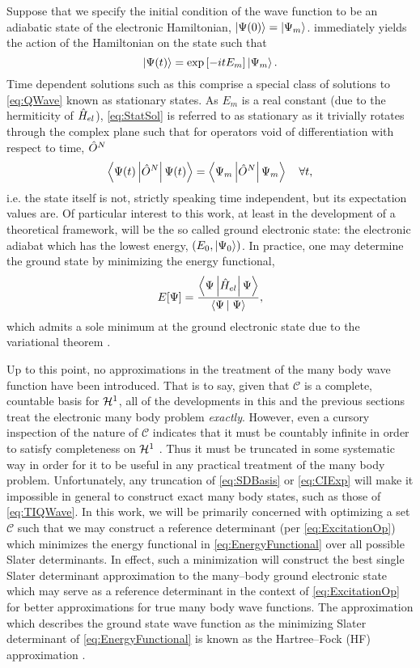 Suppose that we specify the initial condition of the wave function to be an adiabatic state
of the electronic Hamiltonian, $\left\vert \Psi(0) \right\rangle = \left\vert \Psi_m \right\rangle$.  immediately 
yields the action of the Hamiltonian on the state such that
\begin{equation}
\label{eq:StatSol}
\left\vert \Psi(t) \right\rangle = \exp \left[ -it E_m \right] \left\vert \Psi_m \right\rangle. 
\end{equation}
Time dependent solutions such as this comprise a special class of solutions to \cref{eq:QWave} 
known as stationary states. As $E_m$ is a real constant (due to the hermiticity of $\hat{H}_{el}$),
\cref{eq:StatSol} is referred to as stationary as it trivially rotates through the complex plane
such that for operators void of differentiation with respect to time, $\hat{O}^N$
\begin{equation}
\left\langle \Psi(t) \left\vert \hat{O}^N \right\vert \Psi(t) \right\rangle = \left\langle \Psi_m \left\vert \hat{O}^N \right\vert \Psi_m \right\rangle \quad \forall t,
\end{equation}
i.e. the state itself is not, strictly speaking time independent, but its expectation values are.
Of particular interest to this work, at least in the development of a theoretical framework, will be 
the so called ground electronic state: the electronic adiabat which has the lowest energy, $(E_0,\left\vert \Psi_0 \right\rangle)$.
In practice, one may determine the ground state by minimizing the energy functional,
\begin{equation}
\label{eq:EnergyFunctional}
E[\Psi] = \frac{\left\langle \Psi \left\vert \hat{H}_{el} \right\vert \Psi \right\rangle}{\left\langle \Psi \left\vert\right. \Psi \right\rangle},
\end{equation}
which admits a sole minimum at the ground electronic state due to the variational theorem .


Up to this point, no approximations in the treatment of the many body wave function have been introduced. That is
to say, given that $\mathcal{C}$ is a complete, countable basis for $\mathcal{H}^1$, all of the developments
in this and the previous sections treat the electronic many body problem \emph{exactly}. However, even a cursory
inspection of the nature of $\mathcal{C}$ indicates that it must be countably infinite in order to 
satisfy completeness on $\mathcal{H}^1$ . Thus it must be truncated in some systematic
way in order for it to be useful in any practical treatment of the many body problem.
Unfortunately, any truncation of \cref{eq:SDBasis} or \cref{eq:CIExp} will make it impossible in general to
construct exact many body states, such as those of \cref{eq:TIQWave}.
In this work, we will be primarily concerned with optimizing a set $\mathcal{C}$ such that
we may construct a reference determinant (per \cref{eq:ExcitationOp}) which minimizes the energy functional
in \cref{eq:EnergyFunctional} over all possible Slater determinants. In effect, such a minimization will
construct the best single Slater determinant approximation to the many--body ground electronic state
which may serve as a reference determinant in the context of \cref{eq:ExcitationOp} for better approximations
for  true many body wave functions. The approximation which describes the ground state wave function as the 
minimizing Slater determinant of \cref{eq:EnergyFunctional} is known as the Hartree--Fock (HF) approximation .

